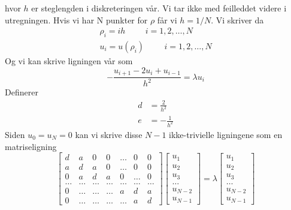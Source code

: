 \documentclass[reprint,english,notitlepage]{revtex4-1}
\begin{document}
	hvor $h$ er steglengden i diskreteringen vår. Vi tar ikke med feilleddet videre i utregningen. Hvis vi har N punkter for $\rho$ får vi $h = 1/N$. Vi skriver da 
	\begin{equation*}
	\begin{aligned}
	\rho_i = ih \hspace{1cm} i=1,2,\dots , N \\
	u_i = u(\rho_i) \hspace{1cm} i=1,2,\dots , N
	\end{aligned}
	\end{equation*}
	Og vi kan skrive ligningen vår som
	\begin{equation*}
	-\frac{u_{i+1} -2u_i +u_{i-1} }{h^2}  = \lambda u_i
	\end{equation*}
	Definerer
	\begin{equation*}
	\begin{aligned}
	d&=\frac{2}{h^2} \\
	e &= -\frac{1}{h^2}
	\end{aligned}
	\end{equation*}
	Siden $u_0 = u_N = 0$ kan vi skrive disse $N - 1$ ikke-trivielle ligningene som en matriseligning
	\begin{equation*}
	\begin{bmatrix} d& a & 0   & 0    & \dots  &0     & 0 \\
	a & d & a & 0    & \dots  &0     &0 \\
	0   & a & d & a  &0       &\dots & 0\\
	\dots  & \dots & \dots & \dots  &\dots      &\dots & \dots\\
	0   & \dots & \dots & \dots  &a  &d & a\\
	0   & \dots & \dots & \dots  &\dots       &a & d\end{bmatrix} 
	\begin{bmatrix} u_1 \\ u_2 \\ u_3 \\ \dots \\ u_{N-2} \\ u_{N-1}\end{bmatrix}
	= \lambda \begin{bmatrix} u_1 \\ u_2 \\ u_3 \\ \dots \\ u_{N-2} \\ u_{N-1}\end{bmatrix}
	\end{equation*}
	
\end{document}
